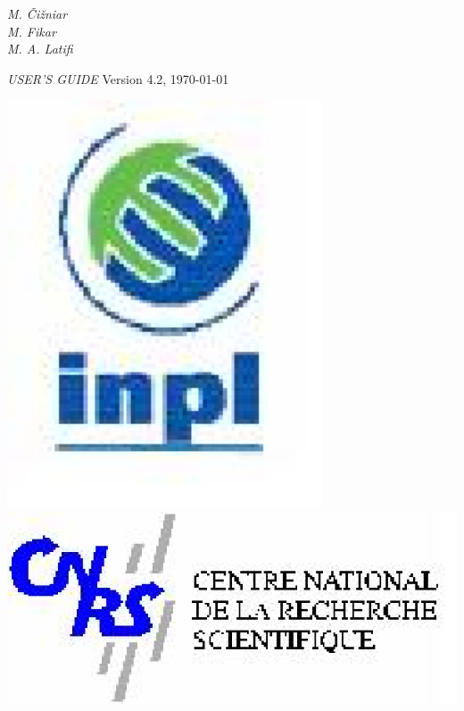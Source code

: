 \begin{minipage}[t]{1\linewidth}
\begin{minipage}[t]{0.78\linewidth}
\begin{minipage}[t]{0.82\linewidth}
\begin{flushleft}
{{{          }
        }}
      \end{flushleft}
    \end{minipage}
    \vspace{2cm}
    \begin{flushright}
      \dynopttitle
      \vspace{1cm}
      {\large{\emph{
        M. \v{C}i\v{z}niar~~~~~\\
        M. Fikar~~~~~\\
        M. A. Latifi~~~~~\\
      }}}
    \end{flushright}
    \vspace{13cm}
    {\LARGE{\emph{USER'S GUIDE}}} 
    \hfill {\large{Version 4.2, \today}}
  \end{minipage}
  \begin{minipage}[t]{0.2\linewidth}
    \vspace{0.1cm}
    \begin{center}
      \includegraphics[width=0.7\textwidth]{pictures/logoinpl}
      \vspace{0.5cm}
      \includegraphics[width=1\textwidth]{pictures/logocnrs}

\end{center}
\end{minipage}
\end{minipage}
